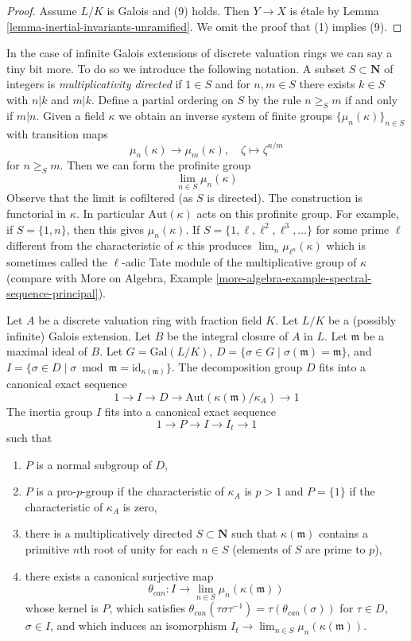 \begin{proof}
\medskip\noindent
Assume $L/K$ is Galois and (9) holds. Then $Y \to X$ is \'etale
by Lemma \ref{lemma-inertial-invariants-unramified}.
We omit the proof that (1) implies (9).
\end{proof}

\noindent
In the case of infinite Galois extensions of discrete valuation rings
we can say a tiny bit more. To do so we introduce the following notation.
A subset $S \subset \mathbf{N}$ of integers is {\it multiplicativity directed}
if $1 \in S$ and for $n, m \in S$ there exists $k \in S$ with
$n | k$ and $m | k$. Define a partial ordering on $S$ by the rule
$n \geq_S m$ if and only if $m | n$. Given a field $\kappa$ we obtain
an inverse system of finite groups $\{\mu_n(\kappa)\}_{n \in S}$
with transition maps
$$
\mu_n(\kappa) \longrightarrow \mu_m(\kappa),\quad
\zeta \longmapsto \zeta^{n/m}
$$
for $n \geq_S m$. Then we can form the profinite group
$$
\lim_{n \in S} \mu_n(\kappa)
$$
Observe that the limit is cofiltered (as $S$ is directed).
The construction is functorial in $\kappa$. In particular
$\text{Aut}(\kappa)$ acts on this profinite group.
For example, if $S = \{1, n\}$, then this gives $\mu_n(\kappa)$.
If $S = \{1, \ell, \ell^2, \ell^3, \ldots\}$ for some prime
$\ell$ different from the characteristic of $\kappa$ this produces
$\lim_n \mu_{\ell^n}(\kappa)$
which is sometimes called the $\ell$-adic Tate module of the multiplicative
group of $\kappa$ (compare with
More on Algebra, Example
\ref{more-algebra-example-spectral-sequence-principal}).

\begin{lemma}
\label{lemma-structure-decomposition}
Let $A$ be a discrete valuation ring with fraction field $K$.
Let $L/K$ be a (possibly infinite) Galois extension.
Let $B$ be the integral closure of $A$ in $L$.
Let $\mathfrak m$ be a maximal ideal of $B$.
Let $G = \text{Gal}(L/K)$,
$D = \{\sigma \in G \mid \sigma(\mathfrak m) = \mathfrak m\}$, and
$I = \{\sigma \in D \mid \sigma \bmod \mathfrak m =
\text{id}_{\kappa(\mathfrak m)}\}$.
The decomposition group $D$ fits into a canonical exact sequence
$$
1 \to I \to D \to \text{Aut}(\kappa(\mathfrak m)/\kappa_A) \to 1
$$
The inertia group $I$ fits into a canonical exact sequence
$$
1 \to P \to I \to I_t \to 1
$$
such that
\begin{enumerate}
\item $P$ is a normal subgroup of $D$,
\item $P$ is a pro-$p$-group if the characteristic of
$\kappa_A$ is $p > 1$ and $P = \{1\}$ if the characteristic of $\kappa_A$
is zero,
\item there is a multiplicatively directed $S \subset \mathbf{N}$
such that $\kappa(\mathfrak m)$ contains a primitive $n$th root of unity
for each $n \in S$ (elements of $S$ are prime to $p$),
\item there exists a canonical surjective map
$$
\theta_{can} : I \to \lim_{n \in S} \mu_n(\kappa(\mathfrak m))
$$
whose kernel is $P$, which satisfies
$\theta_{can}(\tau \sigma \tau^{-1}) = \tau(\theta_{can}(\sigma))$
for $\tau \in D$, $\sigma \in I$, and which induces an isomorphism
$I_t \to \lim_{n \in S} \mu_n(\kappa(\mathfrak m))$.
\end{enumerate}
\end{lemma}

